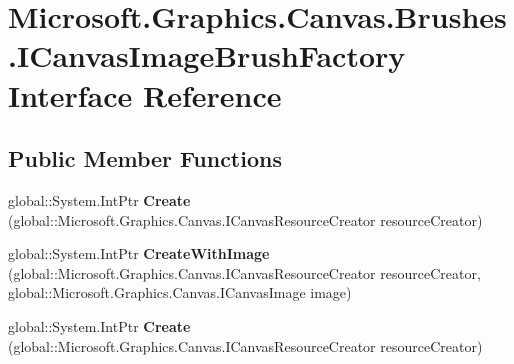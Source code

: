\hypertarget{interface_microsoft_1_1_graphics_1_1_canvas_1_1_brushes_1_1_i_canvas_image_brush_factory}{}\section{Microsoft.\+Graphics.\+Canvas.\+Brushes.\+I\+Canvas\+Image\+Brush\+Factory Interface Reference}
\label{interface_microsoft_1_1_graphics_1_1_canvas_1_1_brushes_1_1_i_canvas_image_brush_factory}
\subsection*{Public Member Functions}
\begin{DoxyCompactItemize}
\item 
\mbox{\label{interface_microsoft_1_1_graphics_1_1_canvas_1_1_brushes_1_1_i_canvas_image_brush_factory_a0aafe7b51d14afc52a9f6afdccb1f678}} 
global\+::\+System.\+Int\+Ptr {\bfseries Create} (global\+::\+Microsoft.\+Graphics.\+Canvas.\+I\+Canvas\+Resource\+Creator resource\+Creator)
\item 
\mbox{\label{interface_microsoft_1_1_graphics_1_1_canvas_1_1_brushes_1_1_i_canvas_image_brush_factory_af53fd276e3f9152ed0f5424d6f168ecd}} 
global\+::\+System.\+Int\+Ptr {\bfseries Create\+With\+Image} (global\+::\+Microsoft.\+Graphics.\+Canvas.\+I\+Canvas\+Resource\+Creator resource\+Creator, global\+::\+Microsoft.\+Graphics.\+Canvas.\+I\+Canvas\+Image image)
\item 
\mbox{\label{interface_microsoft_1_1_graphics_1_1_canvas_1_1_brushes_1_1_i_canvas_image_brush_factory_a0aafe7b51d14afc52a9f6afdccb1f678}} 
global\+::\+System.\+Int\+Ptr {\bfseries Create} (global\+::\+Microsoft.\+Graphics.\+Canvas.\+I\+Canvas\+Resource\+Creator resource\+Creator)
\item 
\mbox{\label{interface_microsoft_1_1_graphics_1_1_canvas_1_1_brushes_1_1_i_canvas_image_brush_factory_af53fd276e3f9152ed0f5424d6f168ecd}} 

\end{DoxyCompactItemize}
